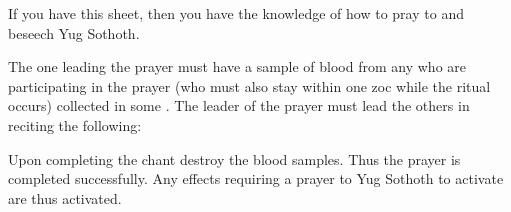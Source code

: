 \documentclass[green]{guildcamp4}
\begin{document}
\name{\gPrayYog{}}

If you have this sheet, then you have the knowledge of how to pray to and beseech Yug Sothoth.

The one leading the prayer must have a sample of blood from any who are participating in the prayer (who must also stay within one zoc while the ritual occurs) collected in some  \iTestTube{}.
The leader of the prayer must lead the others in reciting the following:


Upon completing the chant destroy the blood samples. Thus the prayer is completed successfully. Any effects requiring a prayer to Yug Sothoth to activate are thus activated.
\end{document}
